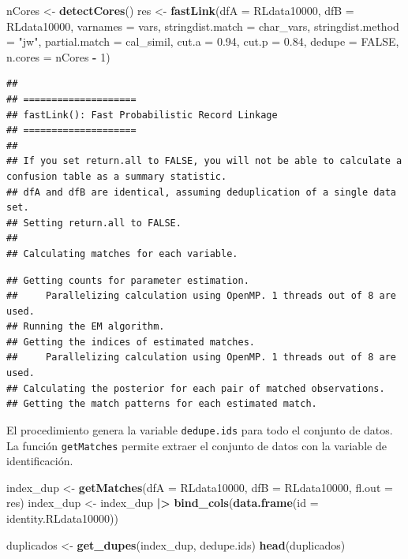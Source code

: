 \documentclass[
  12pt,
]{book}
\newenvironment{Shaded}{\begin{snugshade}}{\end{snugshade}}
\newcommand{\AttributeTok}[1]{\textcolor[rgb]{0.13,0.29,0.53}{#1}}
\newcommand{\ConstantTok}[1]{\textcolor[rgb]{0.56,0.35,0.01}{#1}}
\newcommand{\DecValTok}[1]{\textcolor[rgb]{0.00,0.00,0.81}{#1}}
\newcommand{\FloatTok}[1]{\textcolor[rgb]{0.00,0.00,0.81}{#1}}
\newcommand{\FunctionTok}[1]{\textcolor[rgb]{0.13,0.29,0.53}{\textbf{#1}}}
\newcommand{\NormalTok}[1]{#1}
\newcommand{\OtherTok}[1]{\textcolor[rgb]{0.56,0.35,0.01}{#1}}
\newcommand{\SpecialCharTok}[1]{\textcolor[rgb]{0.81,0.36,0.00}{\textbf{#1}}}
\newcommand{\StringTok}[1]{\textcolor[rgb]{0.31,0.60,0.02}{#1}}
\begin{document}
\begin{Shaded}
\begin{Highlighting}[]
\NormalTok{nCores }\OtherTok{\textless{}{-}} \FunctionTok{detectCores}\NormalTok{()}
\NormalTok{res }\OtherTok{\textless{}{-}} \FunctionTok{fastLink}\NormalTok{(}\AttributeTok{dfA =}\NormalTok{ RLdata10000, }\AttributeTok{dfB =}\NormalTok{ RLdata10000,}
                \AttributeTok{varnames =}\NormalTok{ vars,}
                \AttributeTok{stringdist.match =}\NormalTok{ char\_vars,}
                \AttributeTok{stringdist.method =} \StringTok{"jw"}\NormalTok{,}
                \AttributeTok{partial.match =}\NormalTok{ cal\_simil,}
                \AttributeTok{cut.a =} \FloatTok{0.94}\NormalTok{,}
                \AttributeTok{cut.p =} \FloatTok{0.84}\NormalTok{,}
                \AttributeTok{dedupe =} \ConstantTok{FALSE}\NormalTok{,}
                \AttributeTok{n.cores =}\NormalTok{ nCores }\SpecialCharTok{{-}} \DecValTok{1}\NormalTok{)}
\end{Highlighting}
\end{Shaded}

\begin{verbatim}
## 
## ==================== 
## fastLink(): Fast Probabilistic Record Linkage
## ==================== 
## 
## If you set return.all to FALSE, you will not be able to calculate a confusion table as a summary statistic.
## dfA and dfB are identical, assuming deduplication of a single data set.
## Setting return.all to FALSE.
## 
## Calculating matches for each variable.
\end{verbatim}

\begin{verbatim}
## Getting counts for parameter estimation.
##     Parallelizing calculation using OpenMP. 1 threads out of 8 are used.
## Running the EM algorithm.
## Getting the indices of estimated matches.
##     Parallelizing calculation using OpenMP. 1 threads out of 8 are used.
## Calculating the posterior for each pair of matched observations.
## Getting the match patterns for each estimated match.
\end{verbatim}

El procedimiento genera la variable \texttt{dedupe.ids} para todo el conjunto de datos. La función \texttt{getMatches} permite extraer el conjunto de datos con la variable de identificación.

\begin{Shaded}
\begin{Highlighting}[]
\NormalTok{index\_dup }\OtherTok{\textless{}{-}} \FunctionTok{getMatches}\NormalTok{(}\AttributeTok{dfA =}\NormalTok{ RLdata10000, }\AttributeTok{dfB =}\NormalTok{ RLdata10000, }\AttributeTok{fl.out =}\NormalTok{ res) }
\NormalTok{index\_dup }\OtherTok{\textless{}{-}}\NormalTok{ index\_dup }\SpecialCharTok{|\textgreater{}} \FunctionTok{bind\_cols}\NormalTok{(}\FunctionTok{data.frame}\NormalTok{(}\AttributeTok{id =}\NormalTok{ identity.RLdata10000))}

\NormalTok{duplicados }\OtherTok{\textless{}{-}} \FunctionTok{get\_dupes}\NormalTok{(index\_dup, dedupe.ids)}
\FunctionTok{head}\NormalTok{(duplicados)}
\end{Highlighting}
\end{Shaded}
\end{document}
